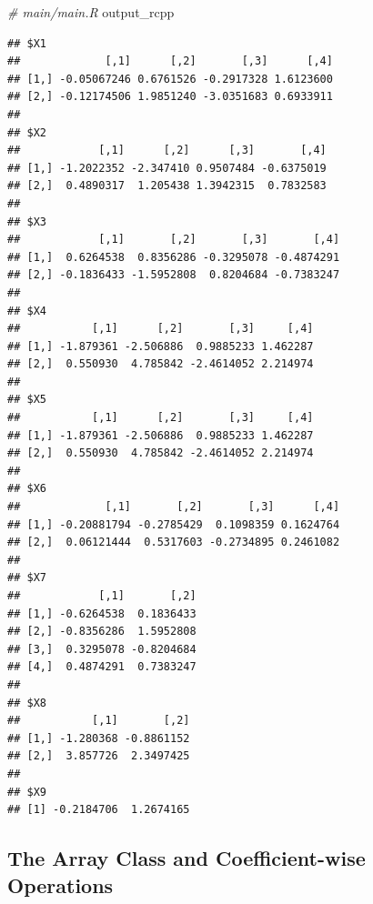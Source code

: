 \documentclass[
]{book}
\newenvironment{Shaded}{\begin{snugshade}}{\end{snugshade}}
\newcommand{\CommentTok}[1]{\textcolor[rgb]{0.56,0.35,0.01}{\textit{#1}}}
\newcommand{\NormalTok}[1]{#1}
\begin{document}
\begin{Shaded}
\begin{Highlighting}[]
\CommentTok{\# main/main.R}
\NormalTok{output\_rcpp}
\end{Highlighting}
\end{Shaded}

\begin{verbatim}
## $X1
##             [,1]      [,2]       [,3]      [,4]
## [1,] -0.05067246 0.6761526 -0.2917328 1.6123600
## [2,] -0.12174506 1.9851240 -3.0351683 0.6933911
## 
## $X2
##            [,1]      [,2]      [,3]       [,4]
## [1,] -1.2022352 -2.347410 0.9507484 -0.6375019
## [2,]  0.4890317  1.205438 1.3942315  0.7832583
## 
## $X3
##            [,1]       [,2]       [,3]       [,4]
## [1,]  0.6264538  0.8356286 -0.3295078 -0.4874291
## [2,] -0.1836433 -1.5952808  0.8204684 -0.7383247
## 
## $X4
##           [,1]      [,2]       [,3]     [,4]
## [1,] -1.879361 -2.506886  0.9885233 1.462287
## [2,]  0.550930  4.785842 -2.4614052 2.214974
## 
## $X5
##           [,1]      [,2]       [,3]     [,4]
## [1,] -1.879361 -2.506886  0.9885233 1.462287
## [2,]  0.550930  4.785842 -2.4614052 2.214974
## 
## $X6
##             [,1]       [,2]       [,3]      [,4]
## [1,] -0.20881794 -0.2785429  0.1098359 0.1624764
## [2,]  0.06121444  0.5317603 -0.2734895 0.2461082
## 
## $X7
##            [,1]       [,2]
## [1,] -0.6264538  0.1836433
## [2,] -0.8356286  1.5952808
## [3,]  0.3295078 -0.8204684
## [4,]  0.4874291  0.7383247
## 
## $X8
##           [,1]       [,2]
## [1,] -1.280368 -0.8861152
## [2,]  3.857726  2.3497425
## 
## $X9
## [1] -0.2184706  1.2674165
\end{verbatim}

\hypertarget{the-array-class-and-coefficient-wise-operations}{%
\subsection{The Array Class and Coefficient-wise Operations}\label{the-array-class-and-coefficient-wise-operations}}
\end{document}
